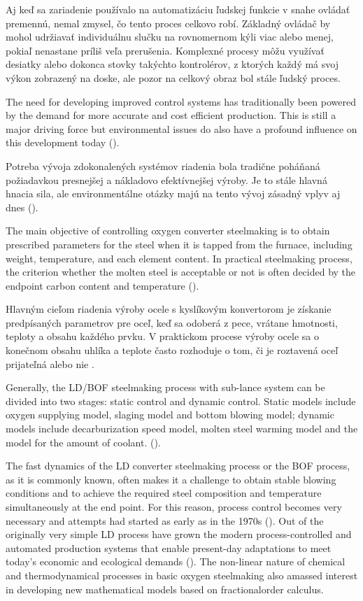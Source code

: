 \documentclass[]{tukediphc}
\begin{document}
Aj keď sa zariadenie používalo na automatizáciu ľudskej funkcie v snahe ovládať premennú, nemal zmysel, čo tento proces celkovo robí. Základný ovládač by mohol udržiavať individuálnu slučku na rovnomernom kýli viac alebo menej, pokiaľ nenastane príliš veľa prerušenia. Komplexné procesy môžu využívať desiatky alebo dokonca stovky takýchto kontrolérov, z ktorých každý má svoj výkon zobrazený na doske, ale pozor na celkový obraz bol stále ľudský proces.

The need for developing improved control systems has traditionally been powered by the demand for more accurate and cost efficient production. This is still a major driving force but environmental issues do also have a profound influence on this development today (\cite{Widlund1998}).

Potreba vývoja zdokonalených systémov riadenia bola tradične poháňaná požiadavkou presnejšej a nákladovo efektívnejšej výroby. Je to stále hlavná hnacia sila, ale environmentálne otázky majú na tento vývoj zásadný vplyv aj dnes (\cite{Widlund1998}).

The main objective of controlling oxygen converter steelmaking is to obtain prescribed parameters for the steel when it is tapped from the furnace, including weight, temperature, and each element content. In practical steelmaking process, the criterion whether the molten steel is acceptable or not is often decided by the endpoint carbon content and temperature (\cite{Wang2010}).

Hlavným cieľom riadenia výroby ocele s kyslíkovým konvertorom je získanie predpísaných parametrov pre oceľ, keď sa odoberá z pece, vrátane hmotnosti, teploty a obsahu každého prvku. V praktickom procese výroby ocele sa o konečnom obsahu uhlíka a teplote často rozhoduje o tom, či je roztavená oceľ prijateľná alebo nie \cite{Wang2010}.

Generally, the LD/BOF steelmaking process with sub-lance system can be divided into two stages: static control and dynamic control. Static models include oxygen supplying model, slaging model and bottom blowing model; dynamic models include decarburization speed model, molten steel warming model and the model for the amount of coolant. (\cite{Wang2010}).

The fast dynamics of the LD converter steelmaking process or the BOF process, as it is commonly known, often makes it a challenge to obtain stable blowing conditions and to achieve the required steel composition and temperature simultaneously at the end point. For this reason, process control becomes very necessary and attempts had started as early as in the 1970s (\cite{Fritz2005}). Out of the originally very simple LD process have grown the modern process-controlled and automated production systems that enable present-day adaptations to meet today’s economic and ecological demands (\cite{Sarkar2015}). The non-linear nature of chemical and thermodynamical processes in basic oxygen steelmaking also amassed interest in developing new mathematical models based on fractionalorder calculus.

%

%
\end{document}
